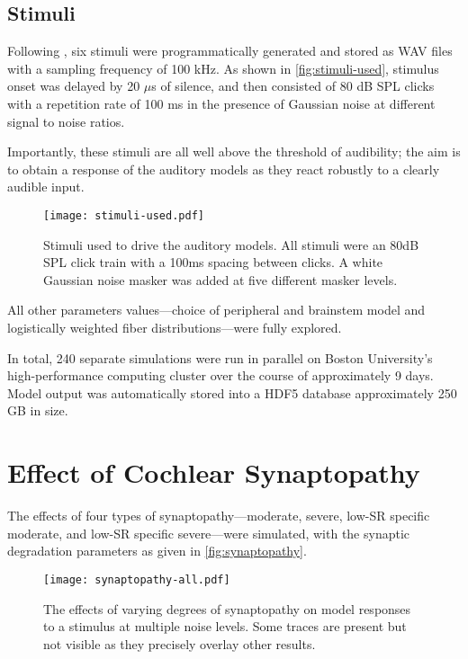 \subsection{Stimuli} %
\label{sub:stimuli}
Following \cite{Mehraei2015Auditory,Mehraei2016Auditory}, six stimuli were programmatically generated and stored as WAV files with a sampling frequency of 100 kHz.  As shown in \autoref{fig:stimuli-used}, stimulus onset was delayed by 20 $\mu$s of silence, and then consisted of 80 dB SPL clicks with a repetition rate of 100 ms in the presence of Gaussian noise at different signal to noise ratios. 

Importantly, these stimuli are all well above the threshold of audibility; the aim is to obtain a response of the auditory models as they react robustly to a clearly audible input. 

\begin{figure}[htbp]
	\centering
	\texttt{[image: stimuli-used.pdf]}
	\caption[Experimental Stimuli]{Stimuli used to drive the auditory models.  All stimuli were an 80dB SPL click train with a 100ms spacing between clicks.  A white Gaussian noise masker was added at five different masker levels.}
	\label{fig:stimuli-used}
\end{figure}

All other parameters values---choice of peripheral and brainstem model and logistically weighted fiber distributions---were fully explored.

In total, 240 separate simulations were run in parallel on Boston University's high-performance computing cluster over the course of approximately 9 days.  Model output was automatically stored into a HDF5 database approximately 250 GB in size.



\section{Effect of Cochlear Synaptopathy} %
\label{sec:effect_of_synaptopathy}
The effects of four types of synaptopathy---moderate, severe, low-SR specific moderate, and low-SR specific severe---were simulated, with the synaptic degradation parameters as given in \autoref{fig:synaptopathy}. 

\begin{figure}[htbp]
	\centering
	\texttt{[image: synaptopathy-all.pdf]}
	\caption[Effects of Synaptopathy]{The effects of varying degrees of synaptopathy on model responses to a stimulus at multiple noise levels.  Some traces are present but not visible as they precisely overlay other results.}
	\label{fig:synaptopathy_results}
\end{figure}

